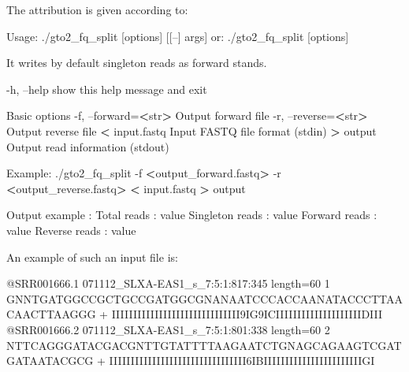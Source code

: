 \documentclass[11pt,]{krantz}
\newenvironment{Shaded}{\begin{snugshade}}{\end{snugshade}}
\newcommand{\OperatorTok}[1]{\textcolor[rgb]{0.43,0.43,0.43}{\textbf{#1}}}
\newcommand{\ExtensionTok}[1]{#1}
\newcommand{\NormalTok}[1]{#1}
\begin{document}
The attribution is given according to:

\begin{Shaded}
\begin{Highlighting}[]
\ExtensionTok{Usage}\NormalTok{: ./gto2_fq_split [options] [[--] args]}
   \ExtensionTok{or}\NormalTok{: ./gto2_fq_split [options]}

\ExtensionTok{It}\NormalTok{ writes by default singleton reads as forward stands.}

    \ExtensionTok{-h}\NormalTok{, --help            show this help message and exit}

\ExtensionTok{Basic}\NormalTok{ options}
    \ExtensionTok{-f}\NormalTok{, --forward=}\OperatorTok{<}\NormalTok{str}\OperatorTok{>}\NormalTok{   Output forward file}
    \ExtensionTok{-r}\NormalTok{, --reverse=}\OperatorTok{<}\NormalTok{str}\OperatorTok{>}\NormalTok{   Output reverse file}
    \OperatorTok{<} \ExtensionTok{input.fastq}\NormalTok{         Input FASTQ file format (stdin)}
    \OperatorTok{>} \ExtensionTok{output}\NormalTok{              Output read information (stdout)}

\ExtensionTok{Example}\NormalTok{: ./gto2_fq_split -f }\OperatorTok{<}\NormalTok{output_forward.fastq}\OperatorTok{>} 
\ExtensionTok{-r} \OperatorTok{<}\NormalTok{output_reverse.fastq}\OperatorTok{>} \OperatorTok{<}\NormalTok{ input.fastq }\OperatorTok{>}\NormalTok{ output}

\ExtensionTok{Output}\NormalTok{ example :}
\ExtensionTok{Total}\NormalTok{ reads      : value}
\ExtensionTok{Singleton}\NormalTok{ reads  : value}
\ExtensionTok{Forward}\NormalTok{ reads    : value}
\ExtensionTok{Reverse}\NormalTok{ reads    : value}
\end{Highlighting}
\end{Shaded}

An example of such an input file is:

\begin{Shaded}
\begin{Highlighting}[]
\ExtensionTok{@SRR001666.1}\NormalTok{ 071112_SLXA-EAS1_s_7:5:1:817:345 length=60 1}
\ExtensionTok{GNNTGATGGCCGCTGCCGATGGCGNANAATCCCACCAANATACCCTTAACAACTTAAGGG}
\ExtensionTok{+}
\ExtensionTok{IIIIIIIIIIIIIIIIIIIIIIIIIIIIII9IG9ICIIIIIIIIIIIIIIIIIIIIDIII}
\ExtensionTok{@SRR001666.2}\NormalTok{ 071112_SLXA-EAS1_s_7:5:1:801:338 length=60 2}
\ExtensionTok{NTTCAGGGATACGACGNTTGTATTTTAAGAATCTGNAGCAGAAGTCGATGATAATACGCG}
\ExtensionTok{+}
\ExtensionTok{IIIIIIIIIIIIIIIIIIIIIIIIIIIIIIII6IBIIIIIIIIIIIIIIIIIIIIIIIGI}
\end{Highlighting}
\end{Shaded}
\end{document}

